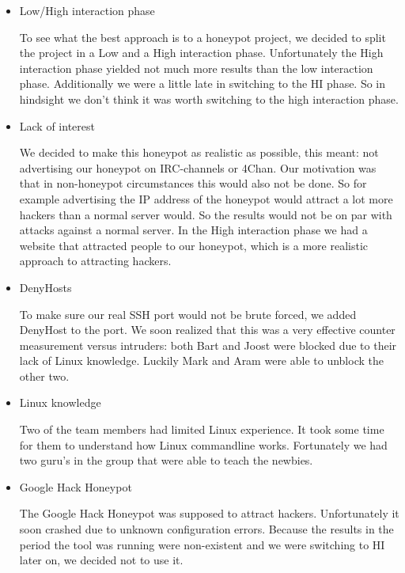 \documentclass[11pt]{article}
\begin{document}
\begin{itemize}
\item Low/High interaction phase

To see what the best approach is to a honeypot project, we decided to split the project in a Low and a High interaction phase. Unfortunately the High interaction phase yielded not much more results than the low interaction phase. Additionally we were a little late in switching to the HI phase. So in hindsight we don't think it was worth switching to the high interaction phase.

\item Lack of interest

We decided to make this honeypot as realistic as possible, this meant: not advertising our honeypot on IRC-channels or 4Chan. Our motivation was that in non-honeypot circumstances this would also not be done. So for example advertising the IP address of the honeypot would attract a lot more hackers than a normal server would. So the results would not be on par with attacks against a normal server. In the High interaction phase we had a website that attracted people to our honeypot, which is a more realistic approach to attracting hackers.

\item DenyHosts

To make sure our real SSH port would not be brute forced, we added DenyHost to the port. We soon realized that this was a very effective counter measurement versus intruders: both Bart and Joost were blocked due to their lack of Linux knowledge. Luckily Mark and Aram were able to unblock the other two.

\item Linux knowledge

Two of the team members had limited Linux experience. It took some time for them to understand how Linux commandline works. Fortunately we had two guru's in the group that were able to teach the newbies.

\item Google Hack Honeypot

The Google Hack Honeypot was supposed to attract hackers. Unfortunately it soon crashed due to unknown configuration errors. Because the results in the period the tool was running were non-existent and we were switching to HI later on, we decided not to use it. 

\end{itemize}



\end{document}
